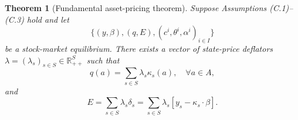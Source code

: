 \documentclass[11pt,a4paper,oneside]{book}
\def\R{\mathbb{R}}
\theoremstyle{plain}
\newtheorem{theorem}{Theorem}[chapter]
\theoremstyle{definition}
\theoremstyle{remark}
\numberwithin{equation}{chapter}
\begin{document}
\begin{theorem}[Fundamental asset-pricing theorem]\label{thm:fundamental}
Suppose Assumptions \textup{(C.1)--(C.3)} hold and let
\begin{equation*}
  \bigl\{ (y, \beta), (q, E), (c^i, \theta^i, \alpha^i)_{i \in I} \bigr\}
\end{equation*}
be a stock-market equilibrium.
There exists a vector of state-price deflators $\lambda = (\lambda_s)_{s \in S} \in \R^S_{++}$ such that
\begin{equation}\label{eq:asset-pricing}
  q(a) = \sum_{s \in S} \lambda_s \kappa_s(a),
  \quad \forall a \in A,
\end{equation}
and
\begin{equation}\label{eq:equity-pricing}
  E = \sum_{s \in S} \lambda_s \delta_s
    = \sum_{s \in S} \lambda_s [ y_s - \kappa_s \cdot \beta ].
\end{equation}
\end{theorem}
\end{document}
